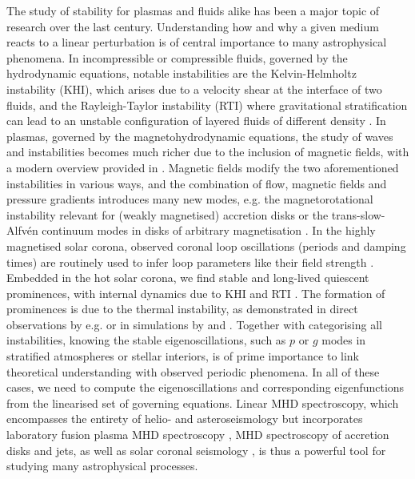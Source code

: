 The study of stability for plasmas and fluids alike has been a major topic of research over the last century. Understanding how and why a given medium reacts to a linear perturbation is of central importance to many astrophysical phenomena. In incompressible or compressible fluids, governed by the hydrodynamic equations, notable instabilities are the Kelvin-Helmholtz instability (\gls{KHI}), which arises due to a velocity shear at the interface of two fluids, and the Rayleigh-Taylor instability (\gls{RTI}) where gravitational stratification can lead to an unstable configuration of layered fluids of different density \citep{book_chandrasekhar,book_choudhuri}. In plasmas, governed by the magnetohydrodynamic equations, the study of waves and instabilities becomes much richer due to the inclusion of magnetic fields, with a modern overview provided in \citet{book_MHD}. Magnetic fields modify the two aforementioned instabilities in various ways, and the combination of flow, magnetic fields and pressure gradients introduces many new modes, e.g. the magnetorotational instability \citep{balbus1991} relevant for (weakly magnetised) accretion disks or the trans-slow-Alfv\'en continuum modes in disks of arbitrary magnetisation \citep{goedbloed2004}. In the highly magnetised solar corona, observed coronal loop oscillations (periods and damping times) are routinely used to infer loop parameters like their field strength \citep{nakariakov2001}. Embedded in the hot solar corona, we find stable and long-lived quiescent prominences, with internal dynamics due to KHI \citep{hillier2018_KHI} and RTI \citep{hillier2018_RTI}. The formation of prominences is due to the thermal instability, as demonstrated in direct observations by e.g. \citet{berger2012} or in simulations by \citet{xia2016} and \citet{claes2020}. Together with categorising all instabilities, knowing the stable eigenoscillations, such as $p$ or $g$ modes in stratified atmospheres or stellar interiors, is of prime importance to link theoretical understanding with observed periodic phenomena. In all of these cases, we need to compute the eigenoscillations and corresponding eigenfunctions from the linearised set of governing equations. Linear MHD spectroscopy, which encompasses the entirety of helio- and asteroseismology but incorporates laboratory fusion plasma MHD spectroscopy \citep{goedbloed1993}, MHD spectroscopy of accretion disks \citep{keppens2002} and jets, as well as solar coronal seismology \citep{book_roberts}, is thus a powerful tool for studying many astrophysical processes.

